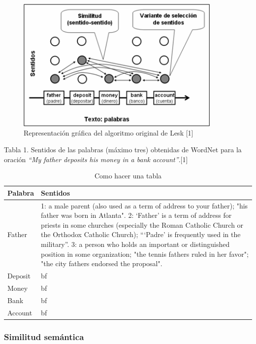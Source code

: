  \begin{figure}[h!]
    \begin{center}
    \includegraphics[angle=0, width=10cm]{Graficos/algoritmo_lesk}
    \caption{Representación gráfica del algoritmo original de Lesk [1]}
    \end{center}
  \end{figure}

  Tabla 1. Sentidos de las palabras (máximo tres) obtenidas de WordNet para la oración \textit{“My father deposits his money in a bank account”}.[1]

  \begin{table}[t]
    \centering
    \begin{tabular}{|m{2cm}|m{10cm}|}
    \hline
    Palabra & Sentidos\\
    \hline
    \hline
    Father & 1: a male parent (also used as a term of address to your father); "his father was born in Atlanta". 
    2: `Father' is a term of address for priests in some churches (especially the Roman Catholic Church or the Orthodox Catholic Church); “`Padre' is frequently used in the military”. 
    3: a person who holds an important or distinguished position in some organization; "the tennis fathers ruled in her favor"; "the city fathers endorsed the proposal".\\
    \hline
    Deposit & bf \\
    \hline
    Money & bf \\
    \hline
    Bank & bf \\
    \hline
    Account& bf \\
    \hline
  \end{tabular}
    \caption{Como hacer una tabla}\label{tab:demo}
  \end{table}

\subsubsection{Similitud semántica}
